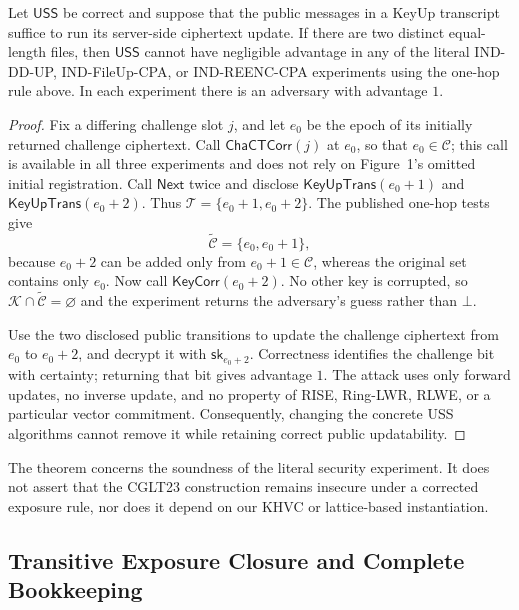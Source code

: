 \begin{theorem}
\label{thm:literal-one-hop}
Let $\mathsf{USS}$ be correct and suppose that the public messages in a KeyUp transcript suffice to run its server-side ciphertext update. If there are two distinct equal-length files, then $\mathsf{USS}$ cannot have negligible advantage in any of the literal IND-DD-UP, IND-FileUp-CPA, or IND-REENC-CPA experiments using the one-hop rule above. In each experiment there is an adversary with advantage $1$.
\end{theorem}
\begin{proof}
Fix a differing challenge slot $j$, and let $e_0$ be the epoch of its initially returned challenge ciphertext. Call $\mathsf{ChaCTCorr}(j)$ at $e_0$, so that $e_0\in\mathcal C$; this call is available in all three experiments and does not rely on Figure~1's omitted initial registration. Call $\mathsf{Next}$ twice and disclose $\mathsf{KeyUpTrans}(e_0+1)$ and $\mathsf{KeyUpTrans}(e_0+2)$. Thus $\mathcal T=\{e_0+1,e_0+2\}$. The published one-hop tests give
\[
 \widetilde{\mathcal C}=\{e_0,e_0+1\},
\]
because $e_0+2$ can be added only from $e_0+1\in\mathcal C$, whereas the original set contains only $e_0$. Now call $\mathsf{KeyCorr}(e_0+2)$. No other key is corrupted, so $\mathcal K\cap\widetilde{\mathcal C}=\varnothing$ and the experiment returns the adversary's guess rather than $\bot$.

Use the two disclosed public transitions to update the challenge ciphertext from $e_0$ to $e_0+2$, and decrypt it with $\mathsf{sk}_{e_0+2}$. Correctness identifies the challenge bit with certainty; returning that bit gives advantage $1$. The attack uses only forward updates, no inverse update, and no property of RISE, Ring-LWR, RLWE, or a particular vector commitment. Consequently, changing the concrete USS algorithms cannot remove it while retaining correct public updatability.
\end{proof}

The theorem concerns the soundness of the literal security experiment. It does not assert that the CGLT23 construction remains insecure under a corrected exposure rule, nor does it depend on our KHVC or lattice-based instantiation.

\subsection{Transitive Exposure Closure and Complete Bookkeeping}

